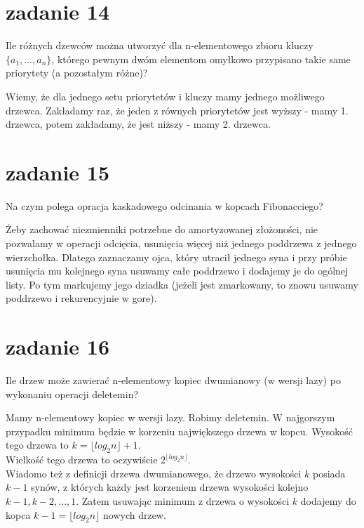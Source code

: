 \section{zadanie 14}
\begin{framed}
Ile różnych dzewców można utworzyć dla n-elementowego zbioru kluczy $\{ a_1, \ldots , a_n \}$, którego pewnym dwóm elementom omyłkowo przypisano takie same priorytety (a pozostałym różne)?
\end{framed}

Wiemy, że dla jednego setu priorytetów i kluczy mamy jednego możliwego drzewca. Zakładamy raz, że jeden z równych priorytetów jest wyższy - mamy 1. drzewca, potem zakładamy, że jest niższy - mamy 2. drzewca.
\section{zadanie 15}
\begin{framed}
Na czym polega opracja kaskadowego odcinania w kopcach Fibonacciego?
\end{framed}

Żeby zachować niezmienniki potrzebne do amortyzowanej złożoności, nie pozwalamy w operacji odcięcia, usunięcia więcej niż jednego poddrzewa z jednego wierzchołka.
Dlatego zaznaczamy ojca, który utracił jednego syna i przy próbie usunięcia mu kolejnego syna usuwamy całe poddrzewo i dodajemy je do ogólnej listy.
Po tym markujemy jego dziadka (jeżeli jest zmarkowany, to znowu usuwamy poddrzewo i rekurencyjnie w gore).

\section{zadanie 16}
\begin{framed}
Ile drzew może zawierać n-elementowy kopiec dwumianowy (w wersji lazy) po wykonaniu operacji deletemin?
\end{framed}

Mamy n-elementowy kopiec w wersji lazy. Robimy deletemin. W najgorszym przypadku minimum będzie w korzeniu największego drzewa w kopcu.
 Wysokość tego drzewa to $ k = {\lfloor log_2{n}\rfloor} + 1$.\\
 Wielkość tego drzewa to oczywiście $2^{\lfloor log_2{n}\rfloor}$.\\
 Wiadomo też z definicji drzewa dwumianowego, że drzewo wysokości $k$ posiada $k-1$ synów, z których każdy jest korzeniem drzewa wysokości kolejno $k-1,k-2,..., 1$.
 Zatem usuwając minimum z drzewa o wysokości $k$ dodajemy do kopca $k-1 = \lfloor log_2{n}\rfloor$ nowych drzew.
 
